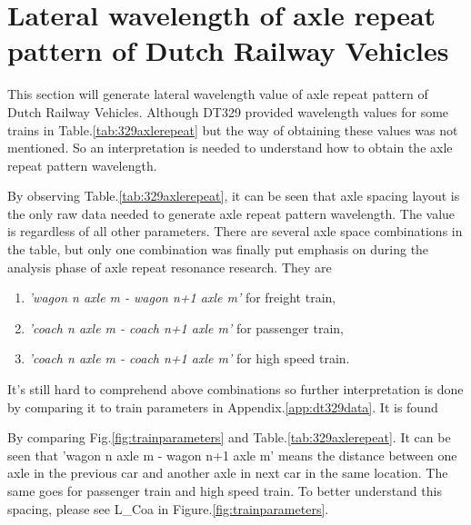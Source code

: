 \section{Lateral wavelength of axle repeat pattern of Dutch Railway Vehicles}

This section will generate lateral wavelength value of axle repeat pattern of Dutch Railway Vehicles. Although DT329 provided wavelength values for some trains in Table.\ref{tab:329axlerepeat} but the way of obtaining these values was not mentioned. So an interpretation is needed to understand how to obtain the axle repeat pattern wavelength.

By observing Table.\ref{tab:329axlerepeat}, it can be seen that axle spacing layout is the only raw data needed to generate axle repeat pattern wavelength. The value is regardless of all other parameters. There are several axle space combinations in the table, but only one combination was finally put emphasis on during the analysis phase of axle repeat resonance research. They are

\begin{enumerate}[-]
    \item \textit{'wagon n axle m - wagon n+1 axle m'} for freight train, 
    \item \textit{'coach n axle m - coach n+1 axle m'} for passenger train,
    \item \textit{'coach n axle m - coach n+1 axle m'} for high speed train.
\end{enumerate}

It's still hard to comprehend above combinations so further interpretation is done by comparing it to train parameters in Appendix.\ref{app:dt329data}. It is found 

By comparing Fig.\ref{fig:trainparameters} and Table.\ref{tab:329axlerepeat}. It can be seen that 'wagon n axle m - wagon n+1 axle m' means the distance between one axle in the previous car and another axle in next car in the same location. The same goes for passenger train and high speed train. To better understand this spacing, please see L\_Coa in Figure.\ref{fig:trainparameters}. 

